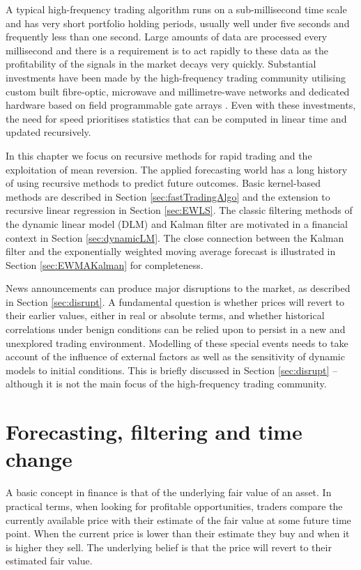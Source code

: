 A typical high-frequency trading algorithm runs on a sub-millisecond time scale and has very short portfolio holding periods, usually well under five seconds and frequently less than one second. Large amounts of data are processed every millisecond and there is a requirement is to act rapidly to these data as the profitability of the signals in the market decays very quickly. Substantial investments have been made by the high-frequency trading community utilising custom built fibre-optic, microwave and millimetre-wave networks and dedicated hardware based on field programmable gate arrays \citep{leber2011high}. Even with these investments, the need for speed prioritises statistics that can be computed in linear time and updated recursively. 

In this chapter we focus on recursive methods for rapid trading and the exploitation of mean reversion. The applied forecasting world has a long history of using recursive methods to predict future outcomes. Basic kernel-based methods are described in Section \ref{sec:fastTradingAlgo} and the extension to recursive linear regression in Section \ref{sec:EWLS}.  The classic filtering methods of the dynamic linear model (DLM) and Kalman filter are motivated in a financial context in Section \ref{sec:dynamicLM}.  The close connection between the Kalman filter and the exponentially weighted moving average forecast is illustrated in Section \ref{sec:EWMAKalman} for completeness. 

News announcements can produce major disruptions to the market, as described in Section \ref{sec:disrupt}. A fundamental question is whether prices will revert to their earlier values, either in real or absolute terms, and whether historical correlations under benign conditions can be relied upon to persist in a new and unexplored trading environment. Modelling of these special events needs to take account of the influence of external factors as well as the sensitivity of dynamic models to initial conditions.  This is briefly discussed in Section \ref{sec:disrupt} -- although it is not the main focus of the high-frequency trading community.  
\section{Forecasting, filtering and time change}\label{sec:forecast}

A basic concept in finance is that of the underlying fair value of an asset. In practical terms, when looking for profitable opportunities, traders compare the currently available price with their estimate of the fair value at some future time point. When the current price is lower than their estimate they buy and when it is higher they sell. The underlying belief is that the price will revert to their estimated fair value. 

